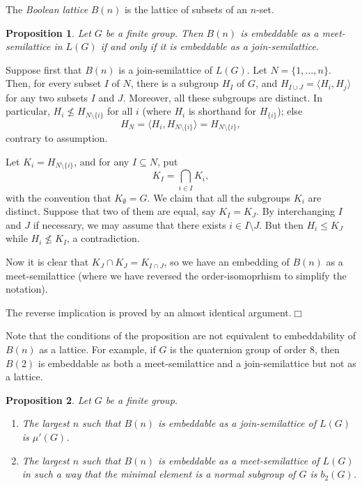 \documentclass[12pt]{article}
\newtheorem{prop}{Proposition}[section]
\newenvironment{pf}{\prepf\rm}{\endprepf}
\newcommand{\qed}{\hfill$\Box$}
\begin{document}
The \emph{Boolean lattice} $B(n)$ is the lattice of subsets of an $n$-set.

\begin{prop}
Let $G$ be a finite group. Then $B(n)$ is embeddable as a meet-semilattice
in $L(G)$ if and only if it is embeddable as a join-semilattice.
\end{prop}

\begin{pf}
Suppose first that $B(n)$ is a join-semilattice of $L(G)$. Let
$N=\{1,\ldots,n\}$. Then, for every subset $I$ of $N$, there is a subgroup
$H_I$ of $G$, and $H_{I\cup J}=\langle H_i,H_j\rangle$ for any two subsets
$I$ and $J$. Moreover, all these subgroups are distinct. In particular,
$H_i\not\le H_{N\setminus\{i\}}$ for all $i$ (where $H_i$ is shorthand for
$H_{\{i\}}$); else
\[H_N=\langle H_i,H_{N\setminus\{i\}}\rangle=H_{N\setminus\{i\}},\]
contrary to assumption.

Let $K_i=H_{N\setminus\{i\}}$, and for any $I\subseteq N$, put
\[K_I=\bigcap_{i\in I}K_i,\]
with the convention that $K_\emptyset=G$. We claim that all the subgroups
$K_i$ are distinct. Suppose that two of them are equal, say $K_I=K_J$.
By interchanging $I$ and $J$ if necessary, we may assume that there exists
$i\in I\setminus J$. But then $H_i\le K_J$ while $H_i\not\le K_I$, a
contradiction.

Now it is clear that $K_J\cap K_J=K_{I\cap J}$, so we have an embedding of
$B(n)$ as a meet-semilattice (where we have reversed the order-isomoprhism
to simplify the notation).

The reverse implication is proved by an almost identical argument.\qed
\end{pf}

Note that the conditions of the proposition are not equivalent to
embeddability of $B(n)$ as a lattice. For example, if $G$ is the quaternion
group of order $8$, then $B(2)$ is embeddable as both a meet-semilattice
and a join-semilattice but not as a lattice.

\begin{prop}
Let $G$ be a finite group.
\begin{enumerate}
\item The largest $n$ such that $B(n)$ is embeddable as a join-semilattice
of $L(G)$ is $\mu'(G)$.
\item The largest $n$ such that $B(n)$ is embeddable as a meet-semilattice
of $L(G)$ in such a way that the minimal element is a normal subgroup of $G$
is $b_2(G)$.
\end{enumerate}
\end{prop}
\end{document}
